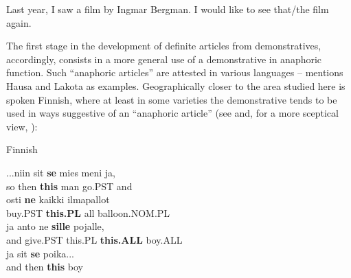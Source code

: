 Last year, I saw a film by Ingmar Bergman. I would like to see that/the film again.



The first stage in the development of definite articles from demonstratives, accordingly, consists in a more general use of a demonstrative in anaphoric function. Such “anaphoric articles” are attested in various languages – \citet[53-54]{Lyons1999} mentions Hausa and Lakota as examples. Geographically closer to the area studied here is spoken Finnish, where at least in some varieties the demonstrative tends to be used in ways suggestive of an “anaphoric article” (see \citet{Laury1997} and, for a more sceptical view, \citet{Juvonen2000}):


\item 

Finnish



 \ea\label{}
\gll ...niin  sit  \textbf{se} mies  meni  ja,\\


so  then  \textbf{this} man  go.PST  and\\

 \ea\label{}
\gll osti  \textbf{ne} kaikki  ilmapallot\\


buy.PST  \textbf{this.PL} all  balloon.NOM.PL\\

 \ea\label{}
\gll ja  anto  ne  \textbf{sille} pojalle,\\


and  give.PST  this.PL  \textbf{this.ALL} boy.ALL\\

 \ea\label{}
\gll ja  sit  \textbf{se} poika...\\


and   then  \textbf{this} boy\\

